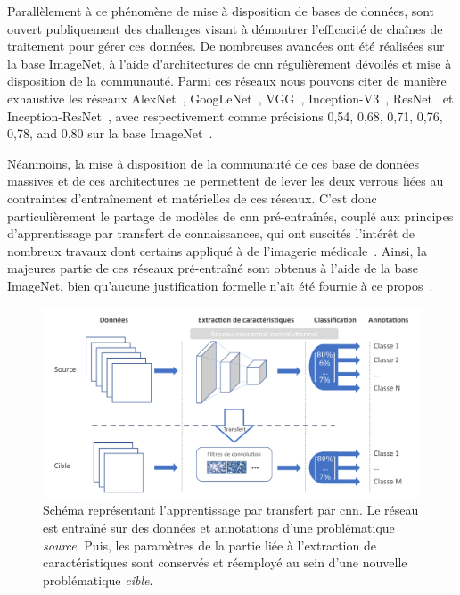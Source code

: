Parallèlement à ce phénomène de mise à disposition de bases de données, sont ouvert publiquement des challenges visant à démontrer l'efficacité de chaînes de traitement pour gérer ces données. De nombreuses avancées ont été réalisées sur la base ImageNet, à l'aide d'architectures de \gls{cnn} régulièrement dévoilés et mise à disposition de la communauté. Parmi ces réseaux nous pouvons citer de manière exhaustive les réseaux AlexNet~\cite{Krizhevsky2012}, GoogLeNet~\cite{Szegedy2015}, VGG~\cite{Simonyan2014}, Inception-V3~\cite{Szegedy2016}, ResNet~\cite{He2016} et Inception-ResNet~\cite{Szegedy2017}, avec respectivement comme précisions 0,54, 0,68, 0,71, 0,76, 0,78, and 0,80 sur la base ImageNet~\cite{Canziani2016}.\par

Néanmoins, la mise à disposition de la communauté de ces base de données massives et de ces architectures ne permettent de lever les deux verrous liées au contraintes d'entraînement et matérielles de ces réseaux. C'est donc particulièrement le partage de modèles de \gls{cnn} pré-entraînés, couplé aux principes d'apprentissage par transfert de connaissances, qui ont suscités l'intérêt de nombreux travaux dont certains appliqué à de l'imagerie médicale~\cite{Litjens2017}. Ainsi, la majeures partie de ces réseaux pré-entraîné sont obtenus à l'aide de la base ImageNet, bien qu'aucune justification formelle n'ait été fournie à ce propos~\cite{Huh2016}.\par
 
\begin{figure}[H]
    \centering
    \includegraphics[width=\linewidth]{contents/chapter_4/resources/scheme_transfer_learning.pdf}
    \caption{Schéma représentant l'apprentissage par transfert par \gls{cnn}. Le réseau est entraîné sur des données et annotations d'une problématique \textit{source}. Puis, les paramètres de la partie liée à l'extraction de caractéristiques sont conservés et réemployé au sein d'une nouvelle problématique \textit{cible}.}
    \label{fig:scheme_transfer_learning}
\end{figure}\par

